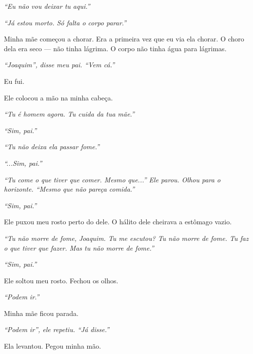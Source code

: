 \noindent \textit{\textquotedblleft{}Eu não vou deixar tu aqui.\textquotedblright{}}

\noindent \textit{\textquotedblleft{}Já estou morto. Só falta o corpo parar.\textquotedblright{}}

\noindent Minha mãe começou a chorar. Era a primeira vez que eu via ela chorar. O choro dela era seco --- não tinha lágrima. O corpo não tinha água para lágrimas.

\noindent \textit{\textquotedblleft{}Joaquim\textquotedblright{}\textit{, disse meu pai. }\textquotedblleft{}Vem cá.\textquotedblright{}}

\noindent Eu fui.

\noindent Ele colocou a mão na minha cabeça.

\noindent \textit{\textquotedblleft{}Tu é homem agora. Tu cuida da tua mãe.\textquotedblright{}}

\noindent \textit{\textquotedblleft{}Sim, pai.\textquotedblright{}}

\noindent \textit{\textquotedblleft{}Tu não deixa ela passar fome.\textquotedblright{}}

\noindent \textit{\textquotedblleft{}...Sim, pai.\textquotedblright{}}

\noindent \textit{\textquotedblleft{}Tu come o que tiver que comer. Mesmo que...\textquotedblright{}\textit{ Ele parou. Olhou para o horizonte. }\textquotedblleft{}Mesmo que não pareça comida.\textquotedblright{}}

\noindent \textit{\textquotedblleft{}Sim, pai.\textquotedblright{}}

\noindent Ele puxou meu rosto perto do dele. O hálito dele cheirava a estômago vazio.

\noindent \textit{\textquotedblleft{}Tu não morre de fome, Joaquim. Tu me escutou? Tu não morre de fome. Tu faz o que tiver que fazer. Mas tu não morre de fome.\textquotedblright{}}

\noindent \textit{\textquotedblleft{}Sim, pai.\textquotedblright{}}

\noindent Ele soltou meu rosto. Fechou os olhos.

\noindent \textit{\textquotedblleft{}Podem ir.\textquotedblright{}}

\noindent Minha mãe ficou parada.

\noindent \textit{\textquotedblleft{}Podem ir\textquotedblright{}\textit{, ele repetiu. }\textquotedblleft{}Já disse.\textquotedblright{}}

\noindent Ela levantou. Pegou minha mão.

